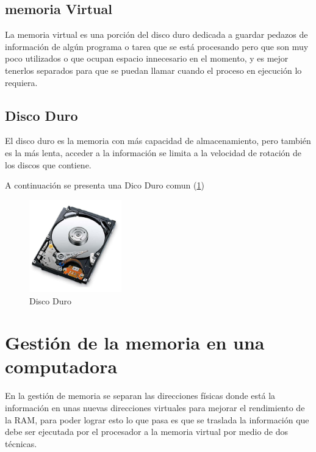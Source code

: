 \documentclass{article}
\begin{document}
\vspace{0.3cm}

\subsection{memoria Virtual}

La memoria virtual es una porción del disco duro dedicada a guardar pedazos de información de algún programa o tarea que se está procesando pero que son muy poco utilizados o que ocupan espacio innecesario en el momento, y es mejor tenerlos separados para que se puedan llamar cuando el proceso en ejecución lo requiera.

\vspace{0.3cm}

\subsection{Disco Duro}

El disco duro es la memoria con más capacidad de almacenamiento, pero también es la más lenta, acceder a la información se limita a la velocidad de rotación de los discos que contiene.

\vspace{0.6cm}

A continuación se presenta una Dico Duro comun (\ref{fig:discoduro})

\begin{figure}[h]
\includegraphics[width=4cm]{discoduro.png}
\centering
\caption{Disco Duro}
\label{fig:discoduro}
\end{figure}

\section{Gestión de la memoria en una computadora} 

En la gestión de memoria se separan las direcciones físicas donde está la información en unas nuevas direcciones virtuales para mejorar el rendimiento de la RAM, para poder lograr esto lo que pasa es que se traslada la información que debe ser ejecutada por el procesador a la memoria virtual por medio de dos técnicas.
\end{document}
